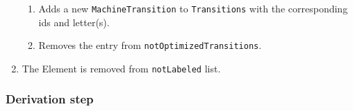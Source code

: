 \documentclass{article}
\begin{document}
\begin{enumerate}
  \begin{enumerate}

    \item Adds a new \verb|MachineTransition| to \verb|Transitions| with the corresponding ids and
    letter(s).

    \item Removes the entry from \verb|notOptimizedTransitions|.

  \end{enumerate}

  \item The Element is removed from \verb|notLabeled| list.

\end{enumerate}

\subsubsection*{Derivation step}
\end{document}
